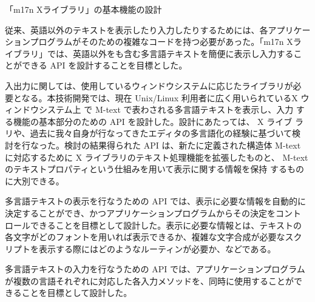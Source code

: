\item 「m17n Xライブラリ」の基本機能の設計 

従来、英語以外のテキストを表示したり入力したりするためには、各アプリケー
ションプログラムがそのための複雑なコードを持つ必要があった。「m17n Xラ
イブラリ」では、英語以外をも含む多言語テキストを簡便に表示し入力するこ
とができる API を設計することを目標とした。

入出力に関しては、使用しているウィンドウシステムに応じたライブラリが必
要となる。本技術開発では、現在 Unix/Linux 利用者に広く用いられているX 
ウィンドウシステム上 で M-text で表わされる多言語テキストを表示し、入力
する機能の基本部分のための API を設計した。設計にあたっては、 X ライブ
ラリや、過去に我々自身が行なってきたエディタの多言語化の経験に基づいて検
討を行なった。検討の結果得られた API は、新たに定義された構造体 M-text 
に対応するために X ライブラリのテキスト処理機能を拡張したものと、
M-text のテキストプロパティという仕組みを用いて表示に関する情報を保持
するものに大別できる。

多言語テキストの表示を行なうための API では、表示に必要な情報を自動的に
決定することができ、かつアプリケーションプログラムからその決定をコント
ロールできることを目標として設計した。表示に必要な情報とは、テキストの
各文字がどのフォントを用いれば表示できるか、複雑な文字合成が必要なスク
リプトを表示する際にはどのようなルーティンが必要か、などである。

多言語テキストの入力を行なうための API では、アプリケーションプログラム
が複数の言語それぞれに対応した各入力メソッドを、同時に使用することがで
きることを目標として設計した。


